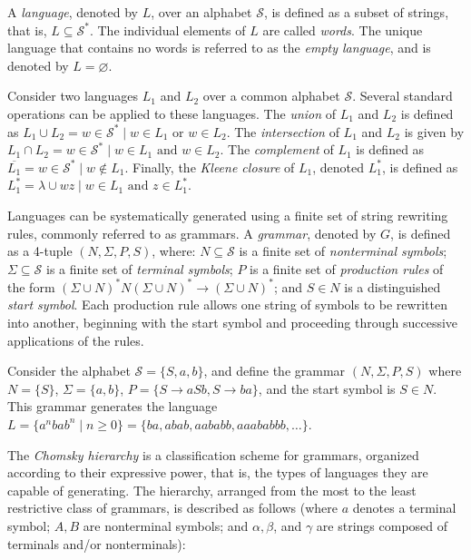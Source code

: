 A \emph{language}, denoted by $L$, over an alphabet $\mathcal{S}$, is defined as a subset of strings, that is, $L \subseteq \mathcal{S}^{\ast}$. The individual elements of $L$ are called \emph{words}. The unique language that contains no words is referred to as the \emph{empty language}, and is denoted by $L = \varnothing$.

Consider two languages $L_1$ and $L_2$ over a common alphabet $\mathcal{S}$. Several standard operations can be applied to these languages. The \emph{union} of $L_1$ and $L_2$ is defined as $L_1 \cup L_2 = { w \in \mathcal{S}^{\ast} \mid w \in L_1 \text{ or } w \in L_2 }$. The \emph{intersection} of $L_1$ and $L_2$ is given by $L_1 \cap L_2 = { w \in \mathcal{S}^{\ast} \mid w \in L_1 \text{ and } w \in L_2 }$. The \emph{complement} of $L_1$ is defined as $\overline{L_1} = { w \in \mathcal{S}^{\ast} \mid w \notin L_1 }$. Finally, the \emph{Kleene closure} of $L_1$, denoted $L_1^\ast$, is defined as $L_1^\ast = { \lambda } \cup { wz \mid w \in L_1 \text{ and } z \in L_1^\ast }$.

Languages can be systematically generated using a finite set of string rewriting rules, commonly referred to as grammars. A \emph{grammar}, denoted by $G$, is defined as a 4-tuple $(N, \Sigma, P, S)$, where: $N \subseteq \mathcal{S}$ is a finite set of \emph{nonterminal symbols}; $\Sigma \subseteq \mathcal{S}$ is a finite set of \emph{terminal symbols}; $P$ is a finite set of \emph{production rules} of the form $(\Sigma \cup N)^\ast N (\Sigma \cup N)^\ast \rightarrow (\Sigma \cup N)^\ast$; and $S \in N$ is a distinguished \emph{start symbol}. Each production rule allows one string of symbols to be rewritten into another, beginning with the start symbol and proceeding through successive applications of the rules.

\begin{example}
\label{ex:context_free_grammar}
Consider the alphabet $\mathcal{S} = \{ S, a, b \}$, and define the grammar $(N, \Sigma, P, S)$ where $N = \{ S \}$, $\Sigma = \{ a, b \}$, $P = \{ S \rightarrow aSb, S \rightarrow ba \}$, and the start symbol is $S \in N$. This grammar generates the language $L = \{ a^nbab^n \mid n\geq0 \} = \{ ba, abab, aababb, aaababbb, \ldots \}$.
\end{example}

The \emph{Chomsky hierarchy} is a classification scheme for grammars, organized according to their expressive power, that is, the types of languages they are capable of generating. The hierarchy, arranged from the most to the least restrictive class of grammars, is described as follows (where $a$ denotes a terminal symbol; $A, B$ are nonterminal symbols; and $\alpha, \beta$, and $\gamma$ are strings composed of terminals and/or nonterminals):

